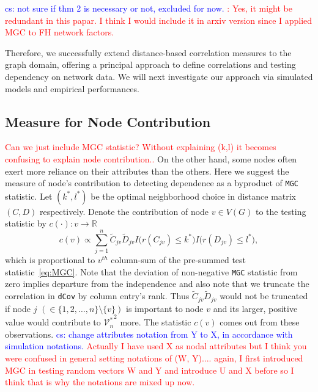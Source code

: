 \documentclass[11pt]{article}
\theoremstyle{definition}
\newcommand{\cs}[1]{\textcolor{blue}{cs: #1}}
\begin{document}

\cs{not sure if thm 2 is necessary or not, excluded for now.} \textcolor{red}{: Yes, it might be redundant in this papar. I think I would include it in arxiv version since I applied MGC to FH network factors.}


Therefore, we successfully extend distance-based correlation measures to the graph domain, offering a principal approach to define correlations and testing dependency on network data. We will next investigate our approach via simulated models and empirical performances.

\subsection{Measure for Node Contribution}
\textcolor{red}{Can we just include MGC statistic? Without explaining (k,l) it becomes confusing to explain node contribution..}
On the other hand, some nodes often exert more reliance on their attributes than the others. Here we suggest the measure of node's contribution to detecting dependence as a byproduct of \texttt{MGC} statistic. Let $(k^{*}, l^{*})$ be the optimal neighborhood choice in distance matrix $(C, D)$ respectively. Denote the contribution of node $v \in V(G)$ to the testing statistic by  $c(\cdot) : v \rightarrow \mathbb{R}$
\begin{equation}
\label{eq:contribution}
c(v) \propto \sum\limits_{j=1}^{n} \tilde{C}_{j v} \tilde{D}_{j v} I \big(  r (C_{j v}) \leq k^{*}  \big) I \big( r (D_{ j v }) \leq l^{*} \big), 
\end{equation}
which is proportional to $v^{th}$ column-sum of the pre-summed test statistic~\ref{eq:MGC}. Note that the deviation of non-negative \texttt{MGC} statistic from zero implies departure from the independence and also note that we truncate the correlation in \texttt{dCov} by column entry's rank. Thus $\tilde{C}_{jv} \tilde{D}_{jv}$ would not be truncated if node $j$ $(\in \{ 1,2, \ldots, n \} \setminus \{v \} )$ is important to node $v$ and its larger, positive value would contribute to ${\mathcal{V}^{*}_{n}}^2$ more. The statistic $c(v)$ comes out from these observations. 
\cs{change attributes notation from Y to X, in accordance with simulation notations. } \textcolor{red}{Actually I have used X as nodal attributes but I think you were confused in general setting notations of (W, Y).... again, I first introduced MGC in testing random vectors W and Y and introduce U and X before so I think that is why the notations are mixed up now.}
\end{document}
